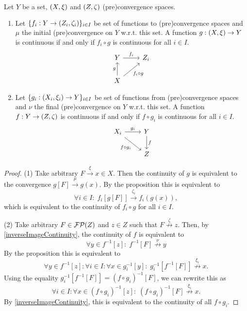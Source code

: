 \begin{corollary} \label{characteristicPropertyInitialFinalConvergence}
Let $Y$ be a set, $\left( X,\xi \right)$ and $\left( Z, \zeta \right)$ (pre)convergence spaces.
\begin{enumerate}
\item Let $\{f_i: Y\to \left( Z_i, \zeta_i \right)\}_{i\in I}$ be set of functions to (pre)convergence spaces and $\mu$ the initial (pre)convergence on $Y$ w.r.t. this set. A function $g: \left( X, \xi \right)\to Y$ is continuous \textup{if and only if} $f_i \circ g$ is continuous for all $i\in I$.
\[ \begin{tikzcd}
Y \ar[r, "f_i"] & Z_i \\ X \ar[u, "g"] \ar[ur, swap, "f_i\circ g"]
\end{tikzcd} \]
\item Let $\{g_i: \left( X_i, \xi_i \right) \to Y\}_{i\in I}$ be set of functions from (pre)convergence spaces and $\nu$ the final (pre)convergence on $Y$ w.r.t. this set. A function $f: Y\to \left( Z,\zeta \right)$ is continuous \textup{if and only if} $f\circ g_i$ is continuous for all $i\in I$.
\[ \begin{tikzcd}
X_i \ar[r, "g_i"] \ar[dr, swap, "f\circ g_i"] & Y \ar[d, "f"] \\ & Z
\end{tikzcd} \]
\end{enumerate}
\end{corollary}
\begin{proof}
(1) Take arbitrary $F\overset{\xi}{\longrightarrow} x\in X$. Then the continuity of $g$ is equivalent to the convergence $g[F] \overset{\mu}{\longrightarrow} g(x)$. By the proposition this is equivalent to
\[ \forall i \in I: \; f_i[g[F]] \overset{\zeta_i}{\longrightarrow} f_i(g(x)),  \]
which is equivalent to the continuity of $f_i\circ g$ for all $i\in I$.

(2) Take arbitrary $F \in \operatorname{\mathcal{FP}}(Z)$ and $z\in Z$ such that $F \overset{\zeta}{\not\to} z$. Then, by \ref{inverseImageContinuity}, the continuity of $f$ is equivalent to
\[ \forall y\in f^{-1}[z]: \; f^{-1}[F] \overset{\nu}{\not\to} y \]
By the proposition this is equivalent to
\[ \forall y\in f^{-1}[z]: \forall i\in I: \forall x\in g_{i}^{-1}[y]: \; g_i^{-1}[f^{-1}[F]] \overset{\xi_i}{\not\to} x. \]
Using the equality $g^{-1}_i[f^{-1}[F]] = (f\circ g_i)^{-1}[F]$, we can rewrite this as
\[ \forall i\in I: \forall x\in (f\circ g_{i})^{-1}[z]: \; (f\circ g_i)^{-1}[F] \overset{\xi_i}{\not\to} x. \]
By \ref{inverseImageContinuity}, this is equivalent to the  continuity of all $f\circ g_i$.
\end{proof}

